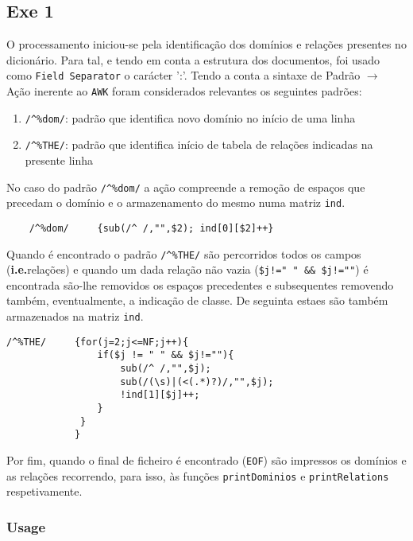 \documentclass{llncs}
\begin{document}
\subsection{Exe 1}
O processamento iniciou-se pela identificação dos domínios e relações presentes no dicionário. Para tal, e tendo em conta a estrutura dos documentos, foi usado como \texttt{Field Separator} o carácter ':'.
Tendo a conta a sintaxe de Padrão $\to$ Ação inerente ao \texttt{AWK} foram considerados relevantes os seguintes padrões:
\begin{enumerate}
    \item \verb|/^%dom/|: padrão que identifica novo domínio no início de uma linha
    \item \verb|/^%THE/|: padrão que identifica início de tabela de relações indicadas na presente linha
\end{enumerate}
No caso do padrão \verb|/^%dom/| a ação compreende a remoção de espaços que precedam o domínio e o armazenamento do mesmo numa matriz \texttt{ind}.
\begin{Verbatim}
    /^%dom/     {sub(/^ /,"",$2); ind[0][$2]++}
\end{Verbatim}
Quando é encontrado o padrão \verb|/^%THE/| são percorridos todos os campos (\textbf{i.e.}relações) e quando um dada relação não vazia (\verb|$j!=" " && $j!=""|) é encontrada são-lhe removidos os espaços precedentes e subsequentes removendo também, eventualmente, a indicação de classe. De seguinta estaes são também armazenados na matriz \texttt{ind}.
\begin{Verbatim}
/^%THE/     {for(j=2;j<=NF;j++){
                if($j != " " && $j!=""){
                    sub(/^ /,"",$j);           
                    sub(/(\s)|(<(.*)?)/,"",$j);
                    !ind[1][$j]++;
                }                              
             }
            }

\end{Verbatim}

Por fim, quando o final de ficheiro é encontrado (\texttt{EOF}) são impressos os domínios e as relações recorrendo, para isso, às funções \texttt{printDominios} e \texttt{printRelations} respetivamente.

\subsubsection{Usage}
\end{document}
